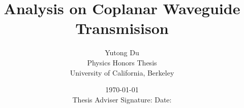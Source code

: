 \documentclass[10pt]{book}
\title{Analysis on Coplanar Waveguide Transmisison}
\author{Yutong Du \\ Physics Honors Thesis \\ University of California, Berkeley}
\date{\today \\ \vspace{9cm} 
	\fontsize{10}{2}\selectfont Thesis Adviser Signature: \hrulefill \hspace{2cm} Date: \hrulefill
}
\begin{document}
	\maketitle


	\tableofcontents

	
	
	
	
	

	\nocite{*}
	\printbibliography
\end{document}
